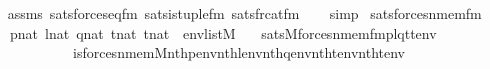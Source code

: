 \begin{isabellebody}
\ \ \isamarkupfalse%
\ assms\ sats{\isacharunderscore}{\kern0pt}forces{\isacharunderscore}{\kern0pt}eq{\isacharprime}{\kern0pt}{\isacharunderscore}{\kern0pt}fm\ sats{\isacharunderscore}{\kern0pt}is{\isacharunderscore}{\kern0pt}tuple{\isacharunderscore}{\kern0pt}fm\ sats{\isacharunderscore}{\kern0pt}frc{\isacharunderscore}{\kern0pt}at{\isacharunderscore}{\kern0pt}fm\isanewline
\ \ \isamarkupfalse%
\ simp%
\endisatagproof
{\isafoldproof}%
%
\isadelimproof
\isanewline
%
\endisadelimproof
\isanewline
{}\isamarkupfalse%
\ sats{\isacharunderscore}{\kern0pt}forces{\isacharunderscore}{\kern0pt}nmem{\isacharprime}{\kern0pt}{\isacharunderscore}{\kern0pt}fm{\isacharcolon}{\kern0pt}\isanewline
\ \ \ \ {\isachardoublequoteopen}p{\isasymin}nat{\isachardoublequoteclose}\ {\isachardoublequoteopen}l{\isasymin}nat{\isachardoublequoteclose}\ {\isachardoublequoteopen}q{\isasymin}nat{\isachardoublequoteclose}\ {\isachardoublequoteopen}t{}{\isasymin}nat{\isachardoublequoteclose}\ {\isachardoublequoteopen}t{}{\isasymin}nat{\isachardoublequoteclose}\ \ {\isachardoublequoteopen}env{\isasymin}list{\isacharparenleft}{\kern0pt}M{\isacharparenright}{\kern0pt}{\isachardoublequoteclose}\isanewline
\ \ \ {\isachardoublequoteopen}sats{\isacharparenleft}{\kern0pt}M{\isacharcomma}{\kern0pt}forces{\isacharunderscore}{\kern0pt}nmem{\isacharunderscore}{\kern0pt}fm{\isacharparenleft}{\kern0pt}p{\isacharcomma}{\kern0pt}l{\isacharcomma}{\kern0pt}q{\isacharcomma}{\kern0pt}t{}{\isacharcomma}{\kern0pt}t{}{\isacharparenright}{\kern0pt}{\isacharcomma}{\kern0pt}env{\isacharparenright}{\kern0pt}\ {\isasymlongleftrightarrow}\isanewline
\ \ \ \ \ \ \ \ \ \ \ \ \ is{\isacharunderscore}{\kern0pt}forces{\isacharunderscore}{\kern0pt}nmem{\isacharprime}{\kern0pt}{\isacharparenleft}{\kern0pt}{\isacharhash}{\kern0pt}{\isacharhash}{\kern0pt}M{\isacharcomma}{\kern0pt}nth{\isacharparenleft}{\kern0pt}p{\isacharcomma}{\kern0pt}env{\isacharparenright}{\kern0pt}{\isacharcomma}{\kern0pt}nth{\isacharparenleft}{\kern0pt}l{\isacharcomma}{\kern0pt}env{\isacharparenright}{\kern0pt}{\isacharcomma}{\kern0pt}nth{\isacharparenleft}{\kern0pt}q{\isacharcomma}{\kern0pt}env{\isacharparenright}{\kern0pt}{\isacharcomma}{\kern0pt}nth{\isacharparenleft}{\kern0pt}t{}{\isacharcomma}{\kern0pt}env{\isacharparenright}{\kern0pt}{\isacharcomma}{\kern0pt}nth{\isacharparenleft}{\kern0pt}t{}{\isacharcomma}{\kern0pt}env{\isacharparenright}{\kern0pt}{\isacharparenright}{\kern0pt}{\isachardoublequoteclose}\isanewline

\end{isabellebody}
